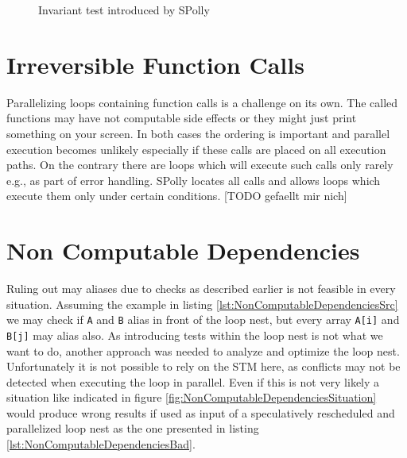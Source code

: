 \lstset{frame=none}
\begin{figure}[htbp]
  \centering
  \hspace*{5mm}
  \caption{Invariant test introduced by SPolly}
  \label{lst:InvariantTest}  
\end{figure}
\resetlst






\section{Irreversible Function Calls}
Parallelizing loops containing function calls is a challenge on its own. 
The called functions may have not computable side effects or they might just 
print something on your screen. In both cases the ordering is important and 
parallel execution becomes unlikely especially if these calls are placed on all
execution paths. On the contrary there are loops which will execute such
calls only rarely e.g., as part of error handling. SPolly locates all calls and
allows loops which execute them only under certain conditions.
[TODO gefaellt mir nich]






\section{Non Computable Dependencies}
\label{NonComputableDependencies}
Ruling out may aliases due to checks as described earlier is not feasible in every
situation. Assuming the example in listing \ref{lst:NonComputableDependenciesSrc}
we may check if \texttt{A} and \texttt{B} alias in front of the loop nest, but
every array \texttt{A[i]} and \texttt{B[j]} may alias also. As introducing tests 
within the loop nest is not what we want to do, another approach was needed to
analyze and optimize the loop nest. Unfortunately it is not possible to rely on 
the STM here, as conflicts may not be detected when executing the loop in parallel.
Even if this is not very likely a situation like indicated in figure
\ref{fig:NonComputableDependenciesSituation} would produce wrong results if used
as input of a speculatively rescheduled and parallelized loop nest as the one 
presented in listing \ref{lst:NonComputableDependenciesBad}.

